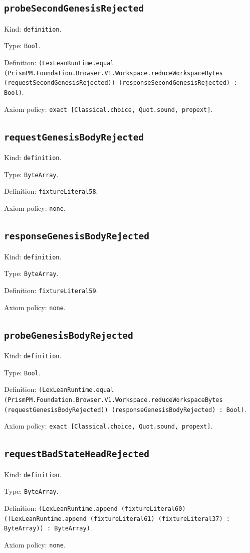 \documentclass[11pt]{article}
\begin{document}
\subsection*{\texttt{probeSecondGenesisRejected}}
\noindent Kind: \texttt{definition}.\par
\noindent Type: \texttt{Bool}.\par
\noindent Definition: \texttt{(LexLeanRuntime.equal (PrismPM.Foundation.Browser.V1.Workspace.reduceWorkspaceBytes (requestSecondGenesisRejected)) (responseSecondGenesisRejected) : Bool)}.\par
\noindent Axiom policy: \texttt{exact [Classical.choice, Quot.sound, propext]}.\par
\subsection*{\texttt{requestGenesisBodyRejected}}
\noindent Kind: \texttt{definition}.\par
\noindent Type: \texttt{ByteArray}.\par
\noindent Definition: \texttt{fixtureLiteral58}.\par
\noindent Axiom policy: \texttt{none}.\par
\subsection*{\texttt{responseGenesisBodyRejected}}
\noindent Kind: \texttt{definition}.\par
\noindent Type: \texttt{ByteArray}.\par
\noindent Definition: \texttt{fixtureLiteral59}.\par
\noindent Axiom policy: \texttt{none}.\par
\subsection*{\texttt{probeGenesisBodyRejected}}
\noindent Kind: \texttt{definition}.\par
\noindent Type: \texttt{Bool}.\par
\noindent Definition: \texttt{(LexLeanRuntime.equal (PrismPM.Foundation.Browser.V1.Workspace.reduceWorkspaceBytes (requestGenesisBodyRejected)) (responseGenesisBodyRejected) : Bool)}.\par
\noindent Axiom policy: \texttt{exact [Classical.choice, Quot.sound, propext]}.\par
\subsection*{\texttt{requestBadStateHeadRejected}}
\noindent Kind: \texttt{definition}.\par
\noindent Type: \texttt{ByteArray}.\par
\noindent Definition: \texttt{(LexLeanRuntime.append (fixtureLiteral60) ((LexLeanRuntime.append (fixtureLiteral61) (fixtureLiteral37) : ByteArray)) : ByteArray)}.\par
\noindent Axiom policy: \texttt{none}.\par
\end{document}
